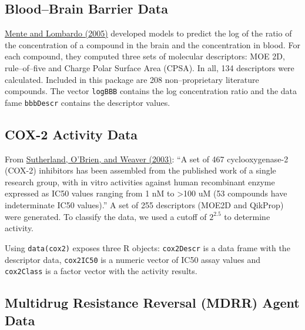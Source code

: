 \documentclass[12pt]{article}
\begin{document}
\subsection{Blood--Brain Barrier Data}


\href{http://www.springerlink.com/content/72j377175n536768/?p=f546488cc8fa4ec7a3d4911eb20adb3c&pi=0} {Mente and Lombardo (2005)} developed models to predict the log of the ratio of the concentration of a compound in the brain and the concentration in blood. For each compound, they computed three sets of molecular descriptors: MOE 2D, rule--of--five and Charge Polar Surface Area (CPSA). In all, 134 descriptors were calculated.  Included in this package are 208 non--proprietary literature compounds. The vector \texttt{logBBB} contains the log concentration ratio and the data fame \texttt{bbbDescr} contains the descriptor values.

\subsection{COX-2 Activity Data}

From  \href{http://pubs.acs.org/cgi-bin/abstract.cgi/jmcmar/2004/47/i22/abs/jm0497141.html}{Sutherland, O'Brien, and Weaver (2003)}: ``A set of 467 cyclooxygenase-2 (COX-2) inhibitors has been assembled from the published work of a single research group, with in vitro activities against human recombinant enzyme expressed as IC50 values ranging from 1 nM to >100 uM (53 compounds have indeterminate IC50
values).'' A set of 255 descriptors (MOE2D and QikProp) were generated. To classify the data, we used a cutoff of $2^{2.5}$ to determine activity.

Using \texttt{data(cox2)} exposes three R objects: \texttt{cox2Descr} is a data frame with the descriptor data, \texttt{cox2IC50} is a numeric vector of IC50 assay values and \texttt{cox2Class} is a factor vector with the activity results.

\subsection{Multidrug Resistance Reversal (MDRR) Agent Data}
\end{document}
